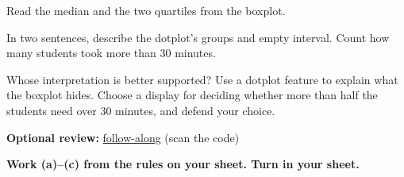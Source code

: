 \documentclass[14pt]{extarticle}
\begin{document}
\begin{description}[leftmargin=1.15in, labelwidth=1in, itemsep=2pt, topsep=2pt]
  \item[\dokbadge{1}~(a)] Read the median and the two quartiles from the boxplot.
  \item[\dokbadge{2}~(b)] In two sentences, describe the dotplot's groups and empty interval. Count how many students took more than 30 minutes.
  \item[\dokbadge{3}~(c)] Whose interpretation is better supported? Use a dotplot feature to explain what the boxplot hides. Choose a display for deciding whether more than half the students need over 30 minutes, and defend your choice.
\end{description}

\vfill
\noindent\begin{minipage}{0.84\linewidth}
\textbf{Optional review:} \href{https://robjohncolson.github.io/apstats-live-worksheet/u1_lesson8_live.html}{follow-along} (scan the code)\par
\textbf{Work (a)--(c) from the rules on your sheet. Turn in your sheet.}
\end{minipage}\hfill
{}
\end{document}
